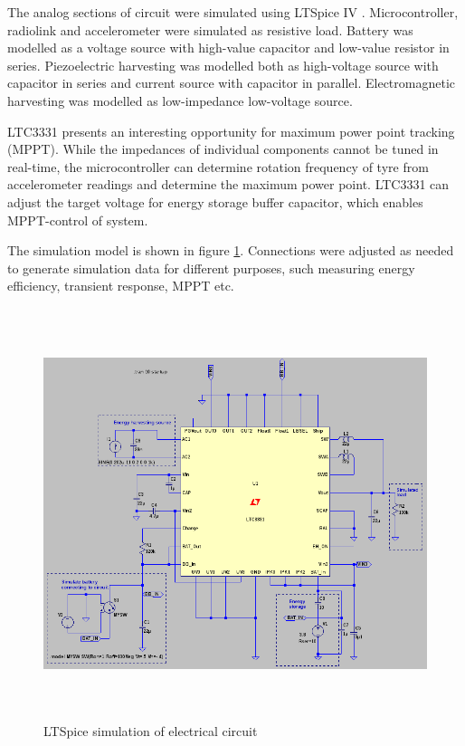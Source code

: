 The analog sections of circuit were simulated using LTSpice IV \cite{ltspice}. Microcontroller, radiolink and accelerometer were simulated as resistive load. Battery was modelled as a voltage source with high-value capacitor and low-value resistor in series. Piezoelectric harvesting was modelled both as high-voltage source with capacitor in series and current source with capacitor in parallel. Electromagnetic harvesting was modelled as low-impedance low-voltage source. 

LTC3331 presents an interesting opportunity for maximum power point tracking (MPPT). While the impedances of individual components cannot be tuned in real-time, the microcontroller can determine rotation frequency of tyre from accelerometer readings and determine the maximum power point. LTC3331 can adjust the target voltage for energy storage buffer capacitor, which enables MPPT-control of system.

The simulation model is shown in figure \ref{fig:ltspice_sim}. Connections were adjusted as needed to generate simulation data for different purposes, such measuring energy efficiency, transient response, MPPT etc.

\begin{figure}[htb]
\begin{center}
\includegraphics[height=12cm]{images/own_dwg/ltspice_ltc3331.jpg}
\end{center}
\caption{\label{fig:ltspice_sim} LTSpice \cite{ltspice} simulation of electrical circuit}
\end{figure}

